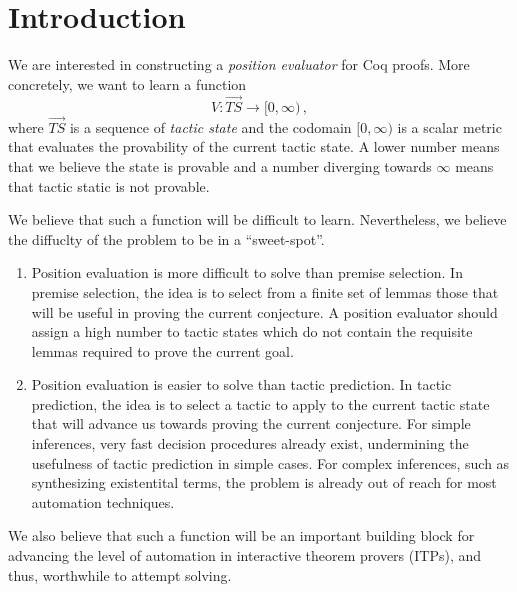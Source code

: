 \documentclass{article}
\begin{document}
\section{Introduction}

We are interested in constructing a \emph{position evaluator} for Coq
proofs. More concretely, we want to learn a function
\[
V: \vec{TS} \rightarrow [0, \infty) \,,
  \]
  where $\vec{TS}$ is a sequence of \emph{tactic state} and the
  codomain $[0, \infty)$ is a scalar metric that evaluates the provability
    of the current tactic state. A lower number means that we believe
    the state is provable and a number diverging towards $\infty$
    means that tactic static is not provable.

We believe that such a function will be difficult to
learn. Nevertheless, we believe the diffuclty of the problem to be in
a ``sweet-spot''.
\begin{enumerate}
\item Position evaluation is more difficult to solve than premise
  selection. In premise selection, the idea is to select from a finite
  set of lemmas those that will be useful in proving the current
  conjecture. A position evaluator should assign a high number to
  tactic states which do not contain the requisite lemmas required to
  prove the current goal.
\item Position evaluation is easier to solve than tactic
  prediction. In tactic prediction, the idea is to select a tactic to
  apply to the current tactic state that will advance us towards
  proving the current conjecture. For simple inferences, very fast
  decision procedures already exist, undermining the usefulness of
  tactic prediction in simple cases. For complex inferences, such as
  synthesizing existentital terms, the problem is already out of reach
  for most automation techniques.
\end{enumerate}
We also believe that such a function will be an important building
block for advancing the level of automation in interactive theorem
provers (ITPs), and thus, worthwhile to attempt solving.
\end{document}
